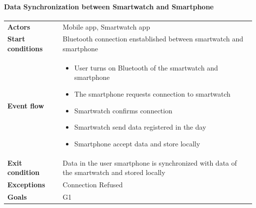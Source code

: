 \paragraph{Data Synchronization between Smartwatch and Smartphone}
\begin{center}
\begin{table}[H]
\centering
\begin{tabular}{l|p{}}
\textbf{Actors} & 
Mobile app, Smartwatch app \\
\textbf{Start conditions} & Bluetooth connection enstablished between smartwatch and smartphone \\
\textbf{Event flow}  & \begin{minipage}[t]{0.7\textwidth}
    \begin{itemize}
        \item User turns on Bluetooth of the smartwatch and smartphone


        \item The smartphone requests connection to smartwatch

        \item Smartwatch confirms connection
        \item Smartwatch send data registered in the day 
        \item Smartphone accept data and store locally

    \end{itemize}
    
\end{minipage}\\
\textbf{Exit condition} & Data in the user smartphone is synchronized with data of the smartwatch and stored locally \\
\textbf{Exceptions} & Connection Refused \\
\textbf{Goals} & G1
\end{tabular}

\end{table}
\end{center}

